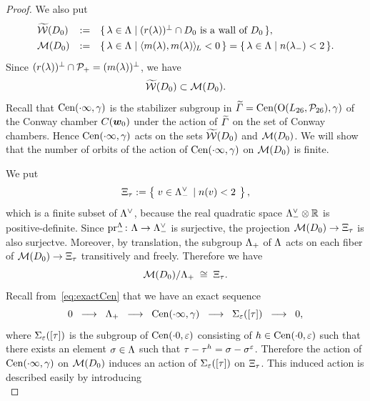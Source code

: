\documentclass{amsart} %
\begin{document}
\begin{proof}
%
We also put 
\[
\renewcommand{\arraystretch}{1.3}
\begin{array}{lll}
\tilwalls(D_0) &:= & \set{\lambda\in \Leech}{\textrm{$(\LeechRoot{\lambda})\sperp \cap D_0$ is a wall of $D_0$}}, \\
\MMM(D_0) &:=& \set{\lambda\in \Leech}{\intfL{m(\lambda), m(\lambda)}<0}=\set{\lambda\in \Leech}{n(\lambdaminus)<2}.
\end{array}
\]
Since $(r(\lambda))^{\perp}\cap \mathord{\mathcal{P}}_{+}=(m(\lambda) )^{\perp}$,
we have 
%
\begin{equation}\label{eq:tilWWWMMM}
\widetilde{\mathord{\mathcal{W}}}(D_0)\subset \mathord{\mathcal{M}}(D_0).
\end{equation}
%
Recall that $\mathrm{Cen}(\cdot \infty, \gamma)$ is 
the  stabilizer subgroup in $\widetilde{\varGamma}=\mathrm{Cen}(\mathord{\mathrm{O}}(L_{26}, \mathord{\mathcal{P}}_{26}), \gamma)$ of the Conway chamber  $\mathord{C}(\boldsymbol{w}_0)$
under the action of $\widetilde{\varGamma}$ on the set of Conway chambers.
Hence $\mathrm{Cen}(\cdot \infty, \gamma)$
acts on the sets $\widetilde{\mathord{\mathcal{W}}}(D_0)$ and $\mathord{\mathcal{M}}(D_0) $.
We will show that the number of orbits of the action of $\mathrm{Cen}(\cdot \infty, \gamma)$ on $ \mathord{\mathcal{M}}(D_0)$
is finite.
\par
We put
%
\begin{equation}\label{eq:Xi}
\Xi_{\tau}:=\left\{\; {v\in \Lambda_{-}^{\vee} } \; \left\vert \; {n(v)<2} \; \right.\right \},
\end{equation}
%
which is a finite subset of $\Lambda^{\vee}$,  because 
the real quadratic space 
$ \Lambda_{-}^{\vee}\otimes \mathord{\mathbb{R}}$ is positive-definite.
Since  $\operatorname{pr}^{\Lambda}_{-}\colon \Lambda \to \Lambda_{-}^{\vee}$ is surjective,
the projection $\mathord{\mathcal{M}}(D_0) \to \Xi_{\tau}$ is also surjectve.
Moreover, by translation,
the subgroup $\Lambda_{+}$ of $\Lambda$ acts on each fiber of $\mathord{\mathcal{M}}(D_0) \to \Xi_{\tau}$ 
transitively and freely.
Therefore we have 
\[
\mathord{\mathcal{M}}(D_0)/\Lambda_{+} \;\cong \; \Xi_{\tau}. 
\]
Recall from~\eqref{eq:exactCen} that
we have an exact sequence
%
\begin{equation}\label{eq:exactCenagain}
0\;\;\longrightarrow\;\;\Lambda_{+}\;\; \longrightarrow \;\; 
\mathrm{Cen}(\cdot \infty, \gamma)
\;\; \longrightarrow \;\; 
\Sigma_{\varepsilon}([\tau])
\;\; \longrightarrow \;\;  0,
\end{equation}
%
where $\Sigma_{\varepsilon}([\tau])$ is the subgroup of $\mathrm{Cen}(\cdot 0, \varepsilon)$
consisting of $h\in \mathrm{Cen}(\cdot 0, \varepsilon)$ such that 
there exists an element $\sigma\in \Lambda$ such  that $\tau-\tau^h=\sigma-\sigma^{\varepsilon}$.
Therefore the action 
of $\mathrm{Cen}(\cdot \infty, \gamma)$ on $\mathord{\mathcal{M}}(D_0)$ induces an action of 
$\Sigma_{\varepsilon}([\tau])$ on $\Xi_{\tau}$. 
This induced action  is described easily by introducing 
%
\begin{equation}\label{eq:tilXi}

\end{equation}
\end{proof}
\end{document}
